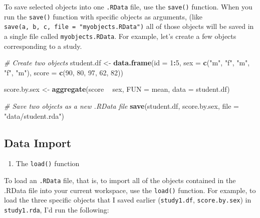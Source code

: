 \documentclass[]{book}
\newenvironment{Shaded}{\begin{snugshade}}{\end{snugshade}}
\newcommand{\KeywordTok}[1]{\textcolor[rgb]{0.13,0.29,0.53}{\textbf{#1}}}
\newcommand{\DataTypeTok}[1]{\textcolor[rgb]{0.13,0.29,0.53}{#1}}
\newcommand{\DecValTok}[1]{\textcolor[rgb]{0.00,0.00,0.81}{#1}}
\newcommand{\StringTok}[1]{\textcolor[rgb]{0.31,0.60,0.02}{#1}}
\newcommand{\CommentTok}[1]{\textcolor[rgb]{0.56,0.35,0.01}{\textit{#1}}}
\newcommand{\OperatorTok}[1]{\textcolor[rgb]{0.81,0.36,0.00}{\textbf{#1}}}
\newcommand{\NormalTok}[1]{#1}
\providecommand{\tightlist}{%
  \setlength{\itemsep}{0pt}\setlength{\parskip}{0pt}}
\begin{document}
To save selected objects into one \texttt{.RData} file, use the
\texttt{save()} function. When you run the \texttt{save()} function with
specific objects as arguments, (like
\texttt{save(a,\ b,\ c,\ file\ =\ "myobjects.RData")} all of those
objects will be saved in a single file called \texttt{myobjects.RData}.
For example, let's create a few objects corresponding to a study.

\begin{Shaded}
\begin{Highlighting}[]
\CommentTok{# Create two objects}
\NormalTok{student.df <-}\StringTok{ }\KeywordTok{data.frame}\NormalTok{(}\DataTypeTok{id =} \DecValTok{1}\OperatorTok{:}\DecValTok{5}\NormalTok{, }
                        \DataTypeTok{sex =} \KeywordTok{c}\NormalTok{(}\StringTok{"m"}\NormalTok{, }\StringTok{"f"}\NormalTok{, }\StringTok{"m"}\NormalTok{, }\StringTok{"f"}\NormalTok{, }\StringTok{"m"}\NormalTok{), }
                        \DataTypeTok{score =} \KeywordTok{c}\NormalTok{(}\DecValTok{90}\NormalTok{, }\DecValTok{80}\NormalTok{, }\DecValTok{97}\NormalTok{, }\DecValTok{62}\NormalTok{, }\DecValTok{82}\NormalTok{))}

\NormalTok{score.by.sex <-}\StringTok{ }\KeywordTok{aggregate}\NormalTok{(score }\OperatorTok{~}\StringTok{ }\NormalTok{sex, }
                          \DataTypeTok{FUN =}\NormalTok{ mean, }
                          \DataTypeTok{data =}\NormalTok{ student.df)}

\CommentTok{# Save two objects as a new .RData file}
\KeywordTok{save}\NormalTok{(student.df, score.by.sex, }\DataTypeTok{file =} \StringTok{"data/student.rda"}\NormalTok{)}
\end{Highlighting}
\end{Shaded}

\subsection{Data Import}\label{data-import}

\begin{enumerate}
\def\labelenumi{\arabic{enumi}.}
\tightlist
\item
  The \texttt{load()} function
\end{enumerate}

To load an \texttt{.RData} file, that is, to import all of the objects
contained in the .RData file into your current workspace, use the
\texttt{load()} function. For example, to load the three specific
objects that I saved earlier (\texttt{study1.df}, \texttt{score.by.sex})
in \texttt{study1.rda}, I'd run the following:
\end{document}
